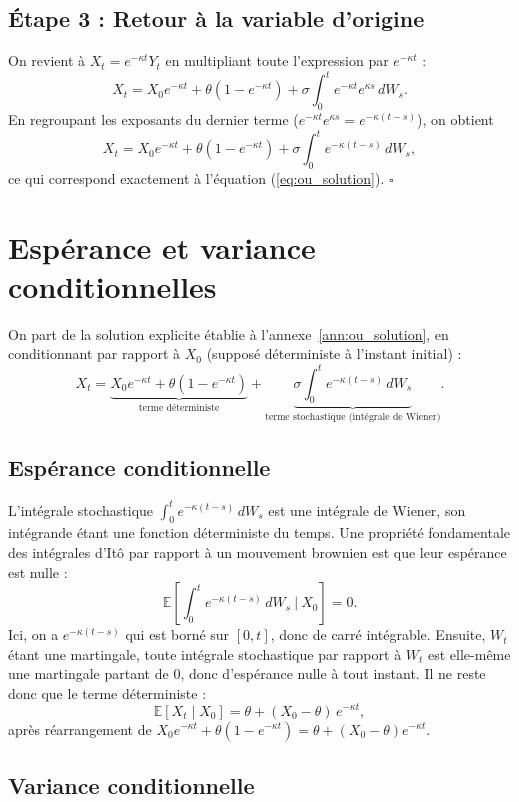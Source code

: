 \subsection*{Étape 3 : Retour à la variable d'origine}

On revient à $X_t = e^{-\kappa t} Y_t$ en multipliant toute l'expression par $e^{-\kappa t}$ :
\[
    X_t = X_0 e^{-\kappa t} + \theta(1 - e^{-\kappa t}) + \sigma\int_0^t e^{-\kappa t}e^{\kappa s}\,dW_s.
\]
En regroupant les exposants du dernier terme ($e^{-\kappa t}e^{\kappa s} = e^{-\kappa(t-s)}$), on obtient
\[
    X_t = X_0 e^{-\kappa t} + \theta(1 - e^{-\kappa t}) + \sigma\int_0^t e^{-\kappa(t-s)}\,dW_s,
\]
ce qui correspond exactement à l'équation (\ref{eq:ou_solution}). \hfill$\square$

\section{Espérance et variance conditionnelles}
\label{ann:ou_moments}

On part de la solution explicite établie à l'annexe~\ref{ann:ou_solution}, en conditionnant par rapport à $X_0$ (supposé déterministe à l'instant initial) :
\[
    X_t = \underbrace{X_0 e^{-\kappa t} + \theta(1 - e^{-\kappa t})}_{\text{terme déterministe}}
    + \underbrace{\sigma\int_0^t e^{-\kappa(t-s)}\,dW_s}_{\text{terme stochastique (intégrale de Wiener)}}.
\]

\subsection*{Espérance conditionnelle}

L'intégrale stochastique $\int_0^t e^{-\kappa(t-s)}\,dW_s$ est une intégrale de Wiener, son intégrande étant une fonction déterministe du temps. Une propriété fondamentale des intégrales d'Itô par rapport à un mouvement brownien est que leur espérance est nulle :
\[
    \mathbb{E}\!\left[\int_0^t e^{-\kappa(t-s)}\,dW_s\ \Big|\ X_0\right] = 0.
\]
Ici, on a $e^{-\kappa(t-s)}$ qui est borné sur $[0,t]$, donc de carré intégrable. Ensuite, $W_t$ étant une martingale, toute intégrale stochastique par rapport à $W_t$ est elle-même une martingale partant de $0$, donc d'espérance nulle à tout instant. Il ne reste donc que le terme déterministe :
\[
    \mathbb{E}[X_t \mid X_0] = \theta + (X_0 - \theta)\,e^{-\kappa t},
\]
après réarrangement de $X_0 e^{-\kappa t} + \theta(1-e^{-\kappa t}) = \theta + (X_0-\theta)e^{-\kappa t}$.

\subsection*{Variance conditionnelle}

